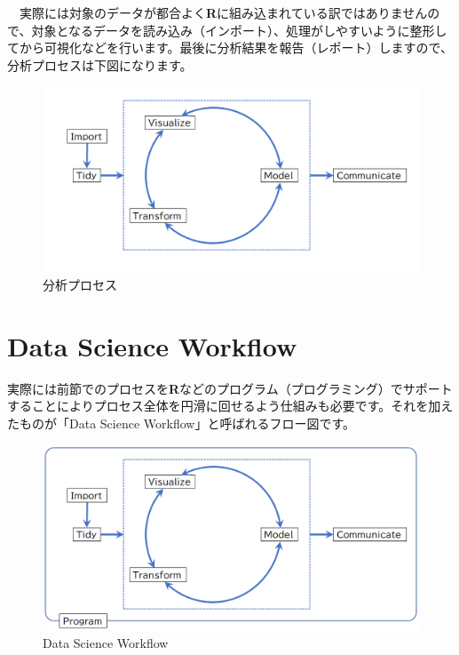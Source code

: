 \documentclass[
  12pt,
]{book}
\begin{document}
　実際には対象のデータが都合よく\textbf{R}に組み込まれている訳ではありませんので、対象となるデータを読み込み（インポート）、処理がしやすいように整形してから可視化などを行います。最後に分析結果を報告（レポート）しますので、分析プロセスは下図になります。

\begin{figure}[H]

{\centering \includegraphics[width=0.85\linewidth,]{./fig/DSWF/data_science_workflow_step2} 

}

\caption{分析プロセス}\label{fig:unnamed-chunk-11}
\end{figure}

\hypertarget{data-science-workflow}{%
\section*{Data Science Workflow}\label{data-science-workflow}}

実際には前節でのプロセスを\textbf{R}などのプログラム（プログラミング）でサポートすることによりプロセス全体を円滑に回せるよう仕組みも必要です。それを加えたものが「Data Science Workflow」と呼ばれるフロー図です。

\begin{figure}[H]

{\centering \includegraphics[width=0.85\linewidth,]{./fig/DSWF/data_science_workflow} 

}

\caption{Data Science Workflow}\label{fig:unnamed-chunk-12}
\end{figure}
\end{document}
